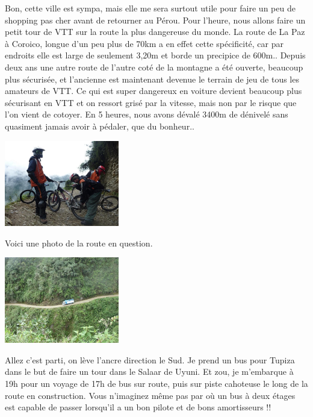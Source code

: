 \begin{multicols}{2}
Bon, cette ville est sympa, mais elle me sera surtout utile pour faire un peu de shopping pas cher avant de retourner au Pérou. Pour l'heure, nous allons faire un petit tour de VTT sur la route la plus dangereuse du monde. La route de La Paz à Coroico, longue d'un peu plus de 70km a en effet cette spécificité, car par endroits elle est large de seulement 3,20m et borde un precipice de 600m.. Depuis deux ans une autre route de l'autre coté de la montagne a été ouverte, beaucoup plus sécurisée, et l'ancienne est maintenant devenue le terrain de jeu de tous les amateurs de VTT. Ce qui est super dangereux en voiture devient beaucoup plus sécurisant en VTT et on ressort grisé par la vitesse, mais non par le risque que l'on vient de cotoyer. En 5 heures, nous avons dévalé 3400m de dénivelé sans quasiment jamais avoir à pédaler, que du bonheur..

\smallbreak
\hspace*{-0.65cm}
\includegraphics[width=5cm]{articles/La-paz-humahuaca-et-salaar/1257387311RBTU.jpg}
\smallbreak

Voici une photo de la route en question.

\smallbreak
\hspace*{-0.65cm}
\includegraphics[width=5cm]{articles/La-paz-humahuaca-et-salaar/1257387218mz18.jpg}
\smallbreak

Allez c'est parti, on lève l'ancre direction le Sud. Je prend un bus pour Tupiza dans le but de faire un tour dans le Salaar de Uyuni. Et zou, je m'embarque à 19h pour un voyage de 17h de bus sur route, puis sur piste cahoteuse le long de la route en construction. Vous n'imaginez même pas par où un bus à deux étages est capable de passer lorsqu'il a un bon pilote et de bons amortisseurs !!


\end{multicols}

